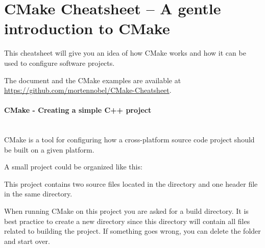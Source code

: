 \documentclass[11pt,a4paper,landscape]{scrartcl} %
\newcommand{\sectiontitle}[1]{\paragraph{#1} \ \\} %
\begin{document}


\section*{CMake Cheatsheet -- A gentle introduction to CMake} %



\setlength{\columnsep}{1.5cm}
\begin{multicols}{2}


This cheatsheet will give you an idea of how CMake works and how it can be used to configure software projects.

The document and the CMake examples are available at  \url{https://github.com/mortennobel/CMake-Cheatsheet}. 

\sectiontitle{CMake - Creating a simple C++ project}
			 
CMake is a tool for configuring how a cross-platform source code project should be built on a given platform. 

A small project could be organized like this: 

\vspace{\baselineskip} %

\noindent{}

\vspace{\baselineskip} %

This project contains two source files located in the  directory and one header file in the same directory.

When running CMake on this project you are asked for a build directory. It is best practice to create a new directory since this directory will contain all files related to building the project. If something goes wrong, you can delete the folder and start over.


\end{multicols}
\end{document}
